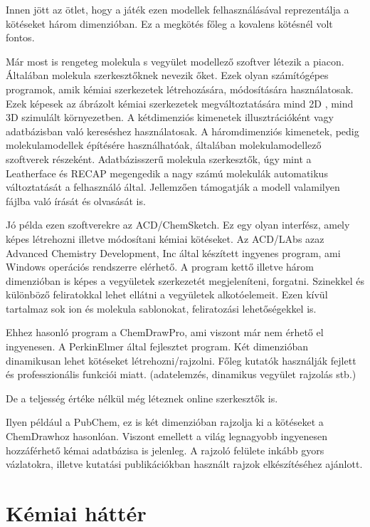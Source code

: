 \documentclass[colorlinks]{thesis-ekf}
\theoremstyle{definition}
\theoremstyle{remark}
\begin{document}
Innen jött az ötlet, hogy a játék ezen modellek felhasználásával reprezentálja a kötéseket három dimenzióban. Ez a megkötés főleg a kovalens kötésnél volt fontos. 

Már most is rengeteg molekula s vegyület modellező szoftver létezik a piacon. Általában molekula szerkesztőknek nevezik őket. Ezek olyan számítógépes programok, amik kémiai szerkezetek létrehozására, módosítására használatosak. Ezek képesek az ábrázolt kémiai szerkezetek megváltoztatására mind 2D , mind 3D  szimulált környezetben. A kétdimenziós kimenetek illusztrációként vagy adatbázisban való kereséshez használatosak. A háromdimenziós kimenetek, pedig molekulamodellek építésére használhatóak, általában molekulamodellező szoftverek részeként.
Adatbázisszerű molekula szerkesztők, úgy mint a Leatherface\cite{Leather} és RECAP\cite{recap} megengedik a nagy számú molekulák automatikus változtatását a felhasználó által.
Jellemzően támogatják a modell valamilyen fájlba való írását és olvasását is. 
\cite{molekula_editorok}

Jó példa ezen szoftverekre az ACD/ChemSketch. Ez egy olyan interfész, amely képes létrehozni illetve módosítani kémiai kötéseket. Az ACD/LAbs azaz Advanced Chemistry Development, Inc által készített ingyenes program, ami Windows operációs rendszerre elérhető.  A program kettő illetve három dimenzióban is képes a vegyületek szerkezetét megjeleníteni, forgatni. Szinekkel és különböző feliratokkal lehet ellátni a vegyületek alkotóelemeit. Ezen kívül tartalmaz sok ion és molekula sablonokat, feliratozási lehetőségekkel is.\cite{wiki_ACD}

Ehhez hasonló program a ChemDrawPro, ami viszont már nem érhető el ingyenesen. A PerkinElmer által fejlesztet program. Két dimenzióban dinamikusan lehet kötéseket létrehozni/rajzolni. Főleg kutatók használják fejlett és professzionális funkciói miatt. (adatelemzés, dinamikus vegyület rajzolás stb.)\cite{ChemDraw}

De a teljesség értéke nélkül még léteznek online szerkesztők is.

Ilyen például a PubChem, ez is két dimenzióban rajzolja ki a kötéseket a ChemDrawhoz hasonlóan. Viszont emellett a világ legnagyobb ingyenesen hozzáférhető kémai adatbázisa is jelenleg. A rajzoló felülete inkább gyors vázlatokra, illetve kutatási publikációkban használt rajzok elkészítéséhez ajánlott. \cite{PubChem}


\chapter{Kémiai háttér}
\end{document}
